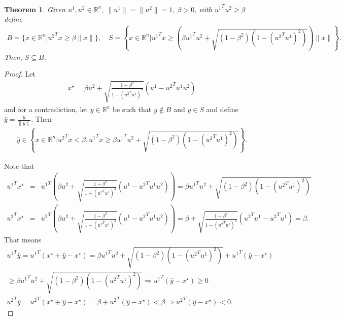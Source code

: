 \documentclass{article}
\newtheorem{theorem}{Theorem}[section]
\theoremstyle{case}
\newcommand{\rn}{{\mathbb R^{n}}}
\begin{document}
\begin{theorem}
\label{cone_subset_cone}
Given $u^1, u^2 \in \rn$, $\|u^1\| = \|u^2\|= 1$, $\beta >0$, with ${u^1}^Tu^2 \ge \beta$ define
\begin{align*}
B = \{x\in\rn | {u^2}^Tx \ge \beta\|x\|\}, \quad
S = \left\{x\in\rn \bigg| {u^1}^Tx \ge \left(\beta {u^1}^Tu^2 + \sqrt{(1 - \beta^2)\left(1 - ({u^2}^Tu^1)^2\right)}\right)\|x\| \right\}. 
\end{align*}
Then, $S \subseteq B$.
\end{theorem}


\begin{proof}
Let 
\begin{align*}
x^{\star} = \beta u^2 + \sqrt{\frac{1 - \beta^2}{1 - ({u^2}^Tu^1)^2}} (u^1 - {u^2}^Tu^1 u^2 )
\end{align*} and for a contradiction, let $y \in \rn$ be such that $y \not \in B$ and $y \in S$ and define $\hat y = \frac{y}{\|y\|}$.
Then
\begin{align*}
\hat y \in \left\{x \in \rn | {u^2}^Tx < \beta, {u^1}^Tx \ge \beta {u^1}^Tu^2 + \sqrt{(1 - \beta^2)\left(1 - ({u^2}^Tu^1)^2\right)} \right\}.
\end{align*}

Note that
\begin{align}
{u^1}^Tx^{\star} &=& {u^1}^T\left(\beta u^2 + \sqrt{\frac{1 - \beta^2}{1 - ({u^2}^Tu^1)^2}} (u^1 - {u^2}^Tu^1 u^2 )\right) = 
\beta {u^1}^Tu^2 + \sqrt{(1 - \beta^2)\left(1 - ({u^2}^Tu^1)^2\right)} \\
{u^2}^Tx^{\star} &=& {u^2}^T\left(\beta u^2 + \sqrt{\frac{1 - \beta^2}{1 - ({u^2}^Tu^1)^2}} (u^1 - {u^2}^Tu^1 u^2 )\right) = 
\beta + \sqrt{\frac{1 - \beta^2}{1 - ({u^2}^Tu^1)^2}} ({u^2}^Tu^1 - {u^2}^Tu^1 ) = \beta.
\end{align}
That means
\begin{align}
{u^1}^T\hat y = {u^1}^T\left(x^{\star} + \hat y - x^{\star}\right) = \beta {u^1}^Tu^2 + \sqrt{(1 - \beta^2)\left(1 - ({u^2}^Tu^1)^2\right)} + {u^1}^T\left(\hat y - x^{\star}\right) \\
\ge \beta {u^1}^Tu^2 + \sqrt{(1 - \beta^2)\left(1 - ({u^2}^Tu^1)^2\right)} 
\Longrightarrow {u^1}^T\left(\hat y - x^{\star}\right) \ge 0 \\
{u^2}^T\hat y = {u^2}^T\left(x^{\star} + \hat y - x^{\star}\right) = \beta + {u^2}^T\left(\hat y - x^{\star}\right) < \beta
\Longrightarrow {u^2}^T\left(\hat y - x^{\star}\right) < 0. \label{the_difference_is_nonzero}
\end{align}


\end{proof}
\end{document}
